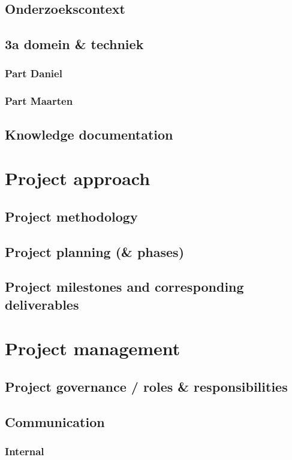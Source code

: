 \documentclass[a4paper,12pt,abstracton,titlepage]{scrartcl}
\begin{document}
\subsection{Onderzoekscontext}
\subsection{3a domein \& techniek}
\subsubsection{Part Daniel}
\subsubsection{Part Maarten}
\subsection{Knowledge documentation}

\section{Project approach}
\subsection{Project methodology}
\subsection{Project planning (\& phases)}
\subsection{Project milestones and corresponding deliverables }

\section{Project management}
\subsection{Project governance / roles \& responsibilities}
\subsection{Communication}
\subsubsection{Internal}
\end{document}
